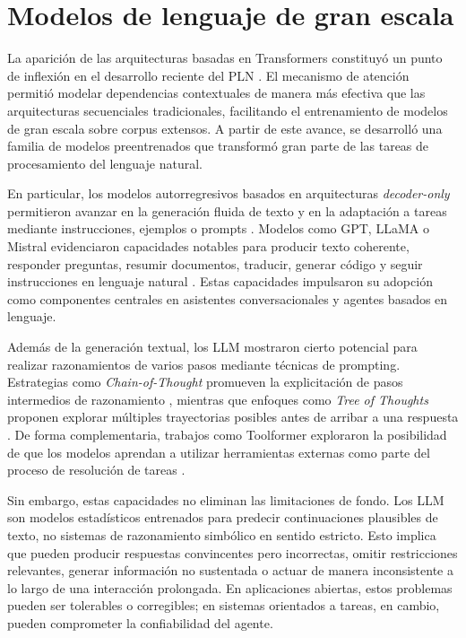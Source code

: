 \section{Modelos de lenguaje de gran escala}

La aparición de las arquitecturas basadas en Transformers constituyó un punto de
inflexión en el desarrollo reciente del \ac{PLN} \citep{vaswani2017attention}. El
mecanismo de atención permitió modelar dependencias contextuales de manera más
efectiva que las arquitecturas secuenciales tradicionales, facilitando el entrenamiento
de modelos de gran escala sobre corpus extensos. A partir de este avance, se desarrolló
una familia de modelos preentrenados que transformó gran parte de las tareas de
procesamiento del lenguaje natural.

En particular, los modelos autorregresivos basados en arquitecturas \emph{decoder-only}
permitieron avanzar en la generación fluida de texto y en la adaptación a tareas mediante
instrucciones, ejemplos o prompts \citep{radford2019language,brown2020language}.
Modelos como GPT, LLaMA o Mistral evidenciaron capacidades notables para producir
texto coherente, responder preguntas, resumir documentos, traducir, generar código y
seguir instrucciones en lenguaje natural \citep{touvron2023llama}. Estas capacidades
impulsaron su adopción como componentes centrales en asistentes conversacionales y
agentes basados en lenguaje.

Además de la generación textual, los \ac{LLM} mostraron cierto potencial para realizar
razonamientos de varios pasos mediante técnicas de prompting. Estrategias como
\emph{Chain-of-Thought} promueven la explicitación de pasos intermedios de
razonamiento \citep{wei2022chain}, mientras que enfoques como \emph{Tree of Thoughts}
proponen explorar múltiples trayectorias posibles antes de arribar a una respuesta
\citep{yao2023tree}. De forma complementaria, trabajos como Toolformer exploraron
la posibilidad de que los modelos aprendan a utilizar herramientas externas como parte
del proceso de resolución de tareas \citep{schick2023toolformer}.

Sin embargo, estas capacidades no eliminan las limitaciones de fondo. Los \ac{LLM}
son modelos estadísticos entrenados para predecir continuaciones plausibles de texto,
no sistemas de razonamiento simbólico en sentido estricto. Esto implica que pueden
producir respuestas convincentes pero incorrectas, omitir restricciones relevantes,
generar información no sustentada o actuar de manera inconsistente a lo largo de una
interacción prolongada. En aplicaciones abiertas, estos problemas pueden ser tolerables
o corregibles; en sistemas orientados a tareas, en cambio, pueden comprometer la
confiabilidad del agente.

